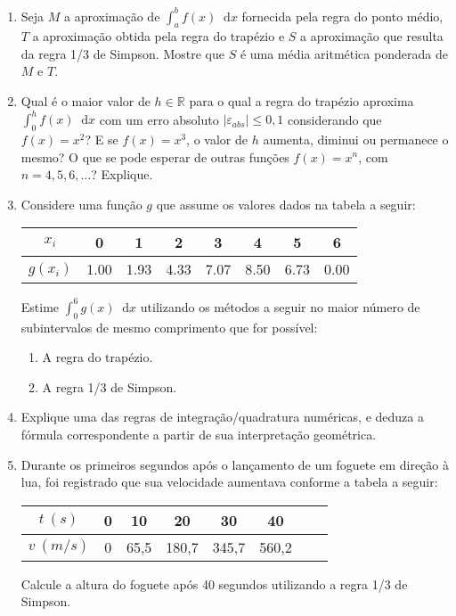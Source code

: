 \documentclass[12pt,a4paper]{article}
\newcommand*\diff{\mathop{}\!\mathrm{d}}
\begin{document}
\begin{enumerate}
\item Seja $M$ a aproximação de $\int_a^b f(x)\diff{x}$ fornecida pela regra do ponto médio, $T$ a aproximação obtida pela regra do trapézio e $S$ a aproximação que resulta da regra 1/3 de Simpson. Mostre que $S$ é uma média aritmética ponderada de $M$ e $T$.

\item Qual é o maior valor de $h \in \mathbb{R}$ para o qual a regra do trapézio aproxima $\int_0^h f(x) \diff{x}$ com um erro absoluto $|\varepsilon_{abs}| \leq 0,1$ considerando que $f(x) = x^2$? E se $f(x) = x^3$, o valor de $h$ aumenta, diminui ou permanece o mesmo? O que se pode esperar de outras funções $f(x) = x^n$, com $n = 4,5,6,\ldots$? Explique.

\item Considere uma função $g$ que assume os valores dados na tabela a seguir:
\begin{center}
\begin{tabular}{|c|c|c|c|c|c|c|c|}
\hline
   $x_i$ & 0 & 1 & 2 & 3 & 4 & 5 & 6 \\ \hline
$g(x_i)$ & 1.00 & 1.93 & 4.33 & 7.07 & 8.50 & 6.73 & 0.00 \\
\hline
\end{tabular}
\end{center}
Estime $\int_0^6 g(x)\diff{x}$ utilizando os métodos a seguir no maior número de subintervalos de mesmo comprimento que for possível:
\begin{multicols}{2}
\begin{enumerate}
\item A regra do trapézio.
\item A regra 1/3 de Simpson.
\end{enumerate}
\end{multicols}

\item Explique uma das regras de integração/quadratura numéricas, e deduza a fórmula correspondente a partir de sua interpretação geométrica.

\item Durante os primeiros segundos após o lançamento de um foguete em direção à lua, foi registrado que sua velocidade aumentava conforme a tabela a seguir:
\begin{center}
\begin{tabular}{|c|c|c|c|c|c|c|c|}
\hline
  $t\ (s)$ & 0 & 10 & 20 & 30 & 40 \\ \hline
$v\ (m/s)$ & 0 & 65,5 & 180,7 & 345,7 & 560,2 \\
\hline
\end{tabular}
\end{center}
Calcule a altura do foguete após 40 segundos utilizando a regra 1/3 de Simpson.


\end{enumerate}
\end{document}
